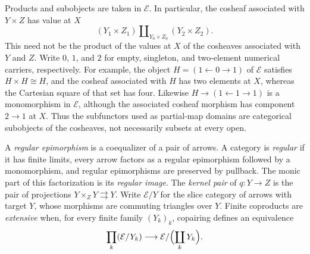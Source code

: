 \documentclass[11pt]{article}
\begin{document}
Products and subobjects are taken in $\mathcal E$. In
particular, the cosheaf associated with $Y\times Z$ has value at $X$
\[
 (Y_1\times Z_1)\amalg_{Y_0\times Z_0}(Y_2\times Z_2).
\]
This need not be the product of the values at $X$ of
the cosheaves associated with $Y$ and $Z$. Write $0$, $1$, and $2$
for empty, singleton, and two-element numerical carriers, respectively.
For example,
the object $H=(1\leftarrow0\to1)$ of $\mathcal E$ satisfies
$H\times H\cong H$,
and the cosheaf associated with $H$ has two elements at $X$,
whereas the Cartesian square of that set has four.
Likewise $H\to(1\leftarrow1\to1)$ is a monomorphism in $\mathcal E$,
although the associated cosheaf morphism has component $2\to1$ at $X$.
Thus the
subfunctors used as partial-map domains are categorical subobjects
of the cosheaves, not necessarily subsets at every open.

A \emph{regular epimorphism} is a coequalizer of a pair of arrows.
A category is \emph{regular} if it has finite limits, every arrow
factors as a regular epimorphism followed by a monomorphism, and
regular epimorphisms are preserved by pullback. The monic part of
this factorization is its \emph{regular image}. The \emph{kernel
pair} of $q:Y\to Z$ is the pair of projections
$Y\times_ZY\rightrightarrows Y$.
Write $\mathcal E/Y$ for the slice category of arrows with target $Y$,
whose morphisms are commuting triangles over $Y$.
Finite coproducts are \emph{extensive} when, for every finite family
$(Y_k)_k$, copairing defines an equivalence
\[
 \prod_k(\mathcal E/Y_k)\longrightarrow
 \mathcal E/\Bigl(\coprod_kY_k\Bigr).
\]
\end{document}
